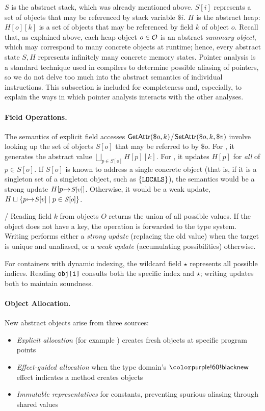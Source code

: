 $S$ is the abstract stack, which was already mentioned above.
$S[i]$ represents a set of objects that may be referenced
by stack variable $\$i$.
$H$ is the abstract heap: $H[o][k]$ is a set of objects that
may be referenced by field $k$ of object $o$.
Recall that, as explained above, each heap object $o\in\mathcal{O}$
is an abstract \emph{summary object}, which may correspond
to many concrete objects at runtime;
hence, every abstract state $S,H$ represents infinitely
many concrete memory states.
Pointer analysis is a standard technique used in compilers
to determine possible aliasing of pointers, so we do not
delve too much into the abstract semantics of individual
instructions.
This subsection is included for completeness and, especially,
to explain the ways in which pointer analysis interacts with
the other analyses.


\paragraph{Field Operations.}
The semantics of explicit field accesses 
$\textsf{GetAttr}(\$o, k)$/$\textsf{SetAttr}(\$o, k, \$v)$
involve looking up the set of objects $S[o]$ that may be
referred to by $\$o$.
For \tGetAttr, it generates the abstract value
$\bigsqcup_{p \in S[o]} H[p][k]$.
For \tSetAttr, it updates $H[p]$ for \emph{all} of $p\in S[o]$.
If $S[o]$ is known to address a single concrete object (that is, if it is a singleton set of a singleton object, such as
$\{\texttt{LOCALS}\}$),
the semantics would be a strong update
$H[p{\hspace{1pt}\mapsto\hspace{1pt}} \mbox{\small $S[v]$}]$.
Otherwise, it would be a weak update,
$H\sqcup\{p{\hspace{1pt}\mapsto\hspace{1pt}} \mbox{\small $S[v]$}\mid p\in \mbox{\small $S[o]$}\}$.

\tGetAttr/\tSetAttr
Reading field $k$ from objects $O$ returns the union of all possible values. If the object does not have a key, the operation is forwarded to the type system. Writing performs either a \emph{strong update} (replacing the old value) when the target is unique and unaliased, or a \emph{weak update} (accumulating possibilities) otherwise.

For containers with dynamic indexing, the wildcard field $\star$ represents all possible indices. Reading \texttt{obj[i]} consults both the specific index and $\star$; writing updates both to maintain soundness.

\paragraph{Object Allocation.}
New abstract objects arise from three sources:
\begin{itemize}
\item \emph{Explicit allocation} (for example \tBind) creates fresh objects at specific program points
\item \emph{Effect-guided allocation} when the type domain's $\tnew$ effect indicates a method creates objects  
\item \emph{Immutable representatives} for constants, preventing spurious aliasing through shared values
\end{itemize}

